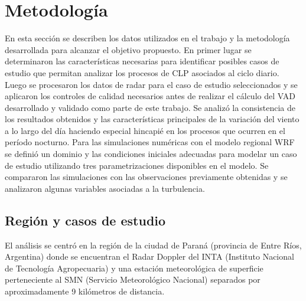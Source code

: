 \documentclass[12pt,spanish,oneside, a4paper]{book}
\begin{document}
\chapter{Metodología}\label{metodologia}

En esta sección se describen los datos utilizados en el trabajo y la
metodología desarrollada para alcanzar el objetivo propuesto. En primer
lugar se determinaron las características necesarias para identificar
posibles casos de estudio que permitan analizar los procesos de CLP
asociados al ciclo diario. Luego se procesaron los datos de radar para
el caso de estudio seleccionados y se aplicaron los controles de calidad
necesarios antes de realizar el cálculo del VAD desarrollado y validado
como parte de este trabajo. Se analizó la consistencia de los resultados
obtenidos y las características principales de la variación del viento a
lo largo del día haciendo especial hincapié en los procesos que ocurren
en el período nocturno. Para las simulaciones numéricas con el modelo
regional WRF se definió un dominio y las condiciones iniciales adecuadas
para modelar un caso de estudio utilizando tres parametrizaciones
disponibles en el modelo. Se compararon las simulaciones con las
observaciones previamente obtenidas y se analizaron algunas variables
asociadas a la turbulencia.

\section{Región y casos de estudio}\label{region-y-casos-de-estudio}

El análisis se centró en la región de la ciudad de Paraná (provincia de
Entre Ríos, Argentina) donde se encuentran el Radar Doppler del INTA
(Instituto Nacional de Tecnología Agropecuaria) y una estación
meteorológica de superficie perteneciente al SMN (Servicio Meteorológico
Nacional) separados por aproximadamente 9 kilómetros de distancia.
\end{document}

